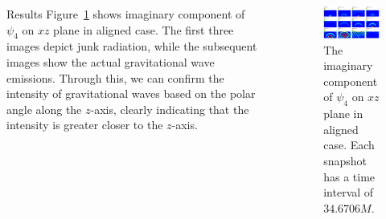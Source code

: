 \documentclass[noamssymb]{beamer}
\newlength{\sepwidth}
\newlength{\colwidth}
\newcommand{\separatorcolumn}{\begin{column}{\sepwidth}\end{column}}
\begin{document}
\begin{frame}[t]
\begin{columns}[t]
\begin{column}{\colwidth}
\begin{block}{Results}
    Figure~\ref{fig:psi4i} shows imaginary component of $\psi_4$ on $xz$ plane in aligned case. The first three images depict junk radiation, while the subsequent images show the actual gravitational wave emissions. Through this, we can confirm the intensity of gravitational waves based on the polar angle along the $z$-axis, clearly indicating that the intensity is greater closer to the $z$-axis.

  \end{block}


\end{column}

\separatorcolumn

\begin{column}{\colwidth}

  \begin{block}{}
  	
  	\begin{figure}
  		\centering
  		\includegraphics[width=\columnwidth]{img/psi4i}
  		\caption{\label{fig:psi4i}The imaginary component of $\psi_4$ on $xz$ plane in aligned case. Each snapshot has a time interval of $34.6706M$.}
  	\end{figure}
	

\end{block}
\end{column}
\end{columns}
\end{frame}
\end{document}
